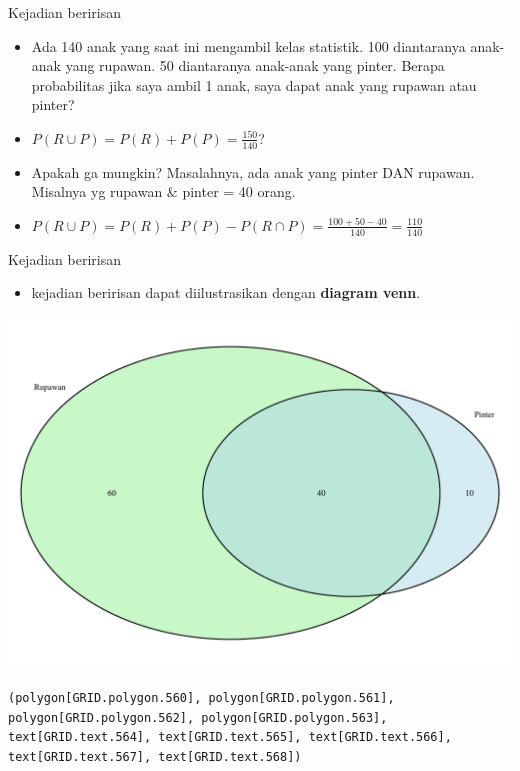 \documentclass[
  ignorenonframetext,
]{beamer}
\providecommand{\tightlist}{%
  \setlength{\itemsep}{0pt}\setlength{\parskip}{0pt}}\usepackage{longtable,booktabs,array}
\begin{document}
\begin{frame}{Kejadian beririsan}
\label{kejadian-beririsan-1}
\begin{itemize}[<+->]
\item
  Ada 140 anak yang saat ini mengambil kelas statistik. 100 diantaranya
  anak-anak yang rupawan. 50 diantaranya anak-anak yang pinter. Berapa
  probabilitas jika saya ambil 1 anak, saya dapat anak yang rupawan atau
  pinter?
\item
  \(P(R \cup P)=P(R)+P(P)=\frac{150}{140}\)?
\item
  Apakah ga mungkin? Masalahnya, ada anak yang pinter DAN rupawan.
  Misalnya yg rupawan \& pinter = 40 orang.
\item
  \(P(R \cup P)=P(R)+P(P)-P(R\cap P)=\frac{100+50-40}{140}=\frac{110}{140}\)
\end{itemize}
\end{frame}

\begin{frame}[fragile]{Kejadian beririsan}
\label{kejadian-beririsan-2}
\begin{itemize}
\tightlist
\item
  kejadian beririsan dapat diilustrasikan dengan \textbf{diagram venn}.
\end{itemize}

\includegraphics{index_files/figure-beamer/unnamed-chunk-11-1.pdf}

\begin{verbatim}
(polygon[GRID.polygon.560], polygon[GRID.polygon.561], polygon[GRID.polygon.562], polygon[GRID.polygon.563], text[GRID.text.564], text[GRID.text.565], text[GRID.text.566], text[GRID.text.567], text[GRID.text.568]) 
\end{verbatim}
\end{frame}
\end{document}
